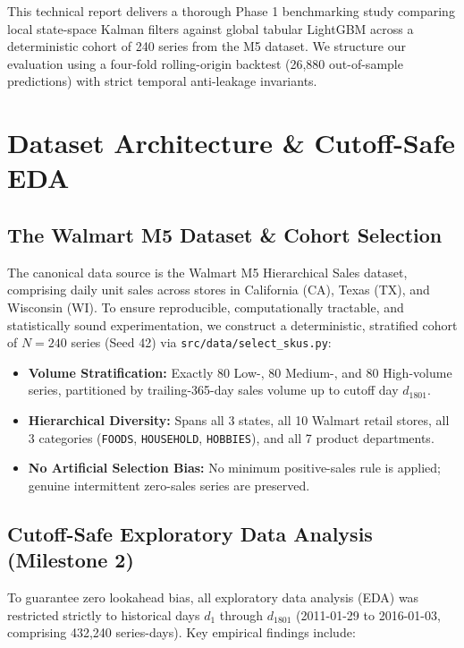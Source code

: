 \documentclass[conference]{IEEEtran}
\begin{document}
This technical report delivers a thorough Phase 1 benchmarking study comparing local state-space Kalman filters against global tabular LightGBM across a deterministic cohort of 240 series from the M5 dataset. We structure our evaluation using a four-fold rolling-origin backtest (26,880 out-of-sample predictions) with strict temporal anti-leakage invariants.

\section{Dataset Architecture \& Cutoff-Safe EDA}

\subsection{The Walmart M5 Dataset \& Cohort Selection}
The canonical data source is the Walmart M5 Hierarchical Sales dataset, comprising daily unit sales across stores in California (CA), Texas (TX), and Wisconsin (WI). To ensure reproducible, computationally tractable, and statistically sound experimentation, we construct a deterministic, stratified cohort of $N=240$ series (Seed 42) via \texttt{src/data/select\_skus.py}:
\begin{itemize}
    \item \textbf{Volume Stratification:} Exactly 80 Low-, 80 Medium-, and 80 High-volume series, partitioned by trailing-365-day sales volume up to cutoff day $d_{1801}$.
    \item \textbf{Hierarchical Diversity:} Spans all 3 states, all 10 Walmart retail stores, all 3 categories (\texttt{FOODS}, \texttt{HOUSEHOLD}, \texttt{HOBBIES}), and all 7 product departments.
    \item \textbf{No Artificial Selection Bias:} No minimum positive-sales rule is applied; genuine intermittent zero-sales series are preserved.
\end{itemize}

\subsection{Cutoff-Safe Exploratory Data Analysis (Milestone 2)}
To guarantee zero lookahead bias, all exploratory data analysis (EDA) was restricted strictly to historical days $d_1$ through $d_{1801}$ (2011-01-29 to 2016-01-03, comprising 432,240 series-days). Key empirical findings include:
\end{document}
